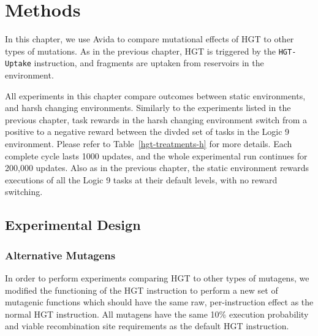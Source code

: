 \documentclass[PhD]{msu-thesis}
\begin{document}
\section{Methods}
In this chapter, we use Avida to compare mutational effects of HGT to other types of mutations. As in the previous chapter, HGT is triggered by the \texttt{HGT-Uptake} instruction, and fragments are uptaken from reservoirs in the environment. 

All experiments in this chapter compare outcomes between static environments, and harsh changing environments. Similarly to the experiments listed in the previous chapter, task rewards in the harsh changing environment switch from a positive to a negative reward between the divded set of tasks in the Logic 9 environment. Please refer to Table~\ref{hgt-treatments-h} for more details. Each complete cycle lasts 1000 updates, and the whole experimental run continues for 200,000 updates. Also as in the previous chapter, the static environment rewards executions of all the Logic 9 tasks at their default levels, with no reward switching.


\subsection{Experimental Design}

\subsubsection{Alternative Mutagens}

In order to perform experiments comparing HGT to other types of mutagens, we modified the functioning of the HGT instruction to perform a new set of mutagenic functions which should have the same raw, per-instruction effect as the normal HGT instruction. All mutagens have the same 10\% execution probability and viable recombination site requirements as the default HGT instruction.
\end{document}
